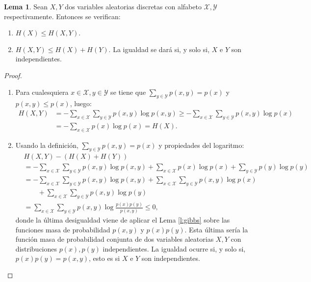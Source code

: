 \documentclass[10pt,a4paper]{article} %
\theoremstyle{definition}
\newtheorem{lemma}[theorem]{Lema}
\begin{document}
\begin{lemma}\label{l:prop_ent_conj} Sean $X, Y$ dos variables aleatorias discretas con alfabeto $\mathcal{X}, \mathcal{Y}$ respectivamente. Entonces se verifican:
  \begin{enumerate}
  \item $H(X) \le H(X, Y)$.
  \item $H(X,Y) \le H(X) + H(Y)$. La igualdad se dará si, y solo si, $X$ e $Y$ son independientes.
  \end{enumerate}
\end{lemma}

\begin{proof}\hfill
  \begin{enumerate}
  \item Para cualesquiera $x \in \mathcal{X}, y \in \mathcal{Y}$ se tiene que $\sum_{y \in \mathcal{Y}} p(x,y) = p(x)$ y $p(x,y) \le p(x)$, luego:
\begin{align*}
  H(X,Y) &= - \sum_{x \in \mathcal{X}} \sum_{y \in \mathcal{Y}} p(x,y) \log p(x,y) \ge - \sum_{x \in \mathcal{X}} \sum_{y \in \mathcal{Y}} p(x,y) \log p(x)\\
   &= - \sum_{x \in \mathcal{X}} p(x) \log p(x) = H(X).
\end{align*}

\item Usando la definición, $\sum_{y \in \mathcal{Y}} p(x,y) = p(x)$ y propiedades del logaritmo:
  \begin{align*}
    &H(X,Y) - (H(X) + H(Y)) \\ &= - \sum_{x \in \mathcal{X}} \sum_{y \in \mathcal{Y}} p(x,y) \log p(x,y) + \sum_{x \in \mathcal{X}} p(x)\log p(x) + \sum_{y \in \mathcal{Y}} p(y)\log p(y)\\
    &= - \sum_{x \in \mathcal{X}} \sum_{y \in \mathcal{Y}} p(x,y) \log p(x,y) + \sum_{x \in \mathcal{X}} \sum_{y \in \mathcal{Y}} p(x,y)\log p(x)\\ &\qquad + \sum_{x \in \mathcal{X}} \sum_{y \in \mathcal{Y}} p(x,y)\log p(y)\\
    &= \sum_{x \in \mathcal{X}} \sum_{y \in \mathcal{Y}} p(x,y) \log \frac{p(x)p(y)}{p(x,y)} \leq 0,
  \end{align*}
  donde la última desigualdad viene de aplicar el Lema \ref{l:gibbs} sobre las funciones masa de probabilidad $p(x,y)$ y $p(x)p(y)$. Esta última sería la función masa de probabilidad conjunta de dos variables aleatorias $X,Y$ con distribuciones $p(x), p(y)$ independientes. La igualdad ocurre si, y solo si, $p(x)p(y) = p(x,y)$, esto es si $X$ e $Y$ son independientes.
  \end{enumerate}
\end{proof}
\end{document}
